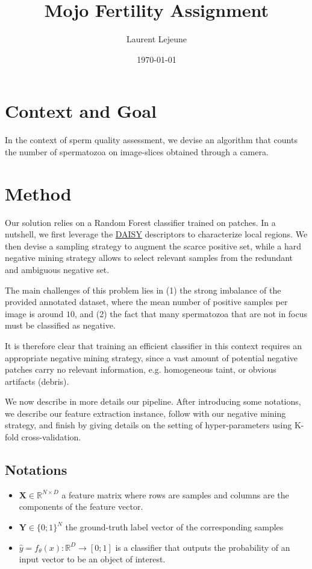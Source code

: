 \documentclass[11pt]{article}
\author{Laurent Lejeune}
\date{\today}
\title{Mojo Fertility Assignment}
\begin{document}
\maketitle

\section{Context and Goal}
\label{sec:orgdbc1f25}

In the context of sperm quality assessment, we devise an algorithm that counts the number of spermatozoa
on image-slices obtained through a camera.


\section{Method}
\label{sec:orgc7e85bd}

Our solution relies on a Random Forest classifier trained on patches.
In a nutshell, we first leverage the \href{https://www.epfl.ch/labs/cvlab/software/descriptors-and-keypoints/daisy/}{DAISY} descriptors to characterize local regions.
We then devise a sampling strategy to augment the scarce positive set, while a hard negative mining strategy allows to select relevant samples from the redundant and ambiguous
negative set.

The main challenges of this problem lies in (1) the strong imbalance of the provided annotated dataset, where the mean number of positive samples per image is around \(10\), and (2) the fact that many spermatozoa that are not
in focus must be classified as negative.

It is therefore clear that training an efficient classifier in this context requires an appropriate
negative mining strategy, since a vast amount of potential negative patches carry no relevant information, e.g.
homogeneous taint, or obvious artifacts (debris).

We now describe in more details our pipeline.
After introducing some notations, we describe our feature extraction instance, follow with
our negative mining strategy, and finish by giving details on the setting of hyper-parameters using K-fold cross-validation.


\subsection{Notations}
\label{sec:org8750891}

\begin{itemize}
\item \(\bm{X} \in \mathbb{R}^{N \times D}\) a feature matrix where rows are samples and columns
are the components of the feature vector.
\item \(\bm{Y} \in \{0;1\}^N\) the ground-truth label vector of the corresponding samples
\item \(\hat{y}= f_{\theta}(x): \mathbb{R}^{D} \rightarrow [0;1]\) is a classifier that outputs the probability of an input vector to be an object of interest.
\end{itemize}
\end{document}
